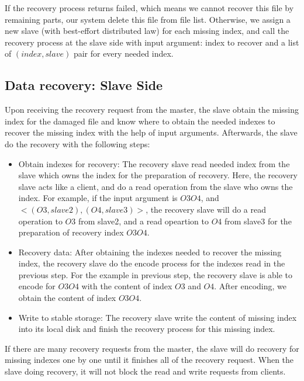 \documentclass[conference]{IEEEtran}
\begin{document}
If the recovery process returns failed, which means we cannot recover this file by remaining parts, our system delete this file from file list. Otherwise, we assign a new slave (with best-effort distributed law) for each missing index, and call the recovery process at the slave side with input argument: index to recover and a list of $(index, slave)$ pair for every needed index. 


\subsection{Data recovery: Slave Side}
Upon receiving the recovery request from the master, the slave obtain the missing index for the damaged file and know where to obtain the needed indexes to recover the missing index with the help of input arguments. Afterwards, the slave do the recovery with the following steps:
\begin{itemize}
\item Obtain indexes for recovery: The recovery slave read needed index from the slave which owns the index for the preparation of recovery. Here, the recovery slave acts like a client, and do a read operation from the slave who owns the index. For example, if the input argument is $O3O4$, and $<(O3,slave2),(O4,slave3)>$, the recovery slave will do a read operation to $O3$ from slave2, and a read opeartion to $O4$ from slave3 for the preparation of recovery index $O3O4$.
\item Recovery data: After obtaining the indexes needed to recover the missing index, the recovery slave do the encode process for the indexes read in the previous step. For the example in previous step, the recovery slave is able to  encode for $O3O4$ with the content of index $O3$ and $O4$. After encoding, we obtain the content of index $O3O4$.
\item Write to stable storage: The recovery slave write the content of missing index into its local disk and finish the recovery process for this missing index.
\end{itemize}
If there are many recovery requests from the master, the slave will do recovery for missing indexes one by one until it finishes all of the recovery request. When the slave doing recovery, it will not block the read and write requests from clients. 
\end{document}
